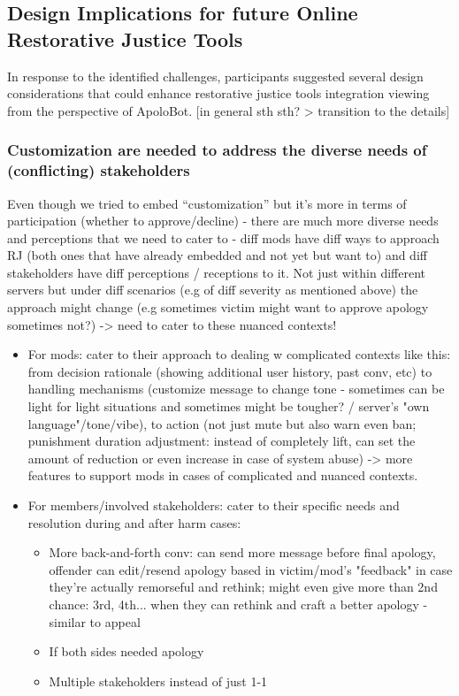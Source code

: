 \subsection{Design Implications for future Online Restorative Justice Tools}
In response to the identified challenges, participants suggested several design considerations that could enhance restorative justice tools integration viewing from the perspective of ApoloBot. [in general sth sth? > transition to the details] 

\subsubsection{Customization are needed to address the diverse needs of (conflicting) stakeholders} Even though we tried to embed “customization” but it’s more in terms of participation (whether to approve/decline) - there are much more diverse needs and perceptions that we need to cater to - diff mods have diff ways to approach RJ (both ones that have already embedded and not yet but want to) and diff stakeholders have diff perceptions / receptions to it. Not just within different servers but under diff scenarios (e.g of diff severity as mentioned above) the approach might change (e.g sometimes victim might want to approve apology sometimes not?) -> need to cater to these nuanced contexts!
\begin{itemize}
    \item For mods: cater to their approach to dealing w complicated contexts like this: from decision rationale (showing additional user history, past conv, etc) to handling mechanisms (customize message to change tone - sometimes can be light for light situations and sometimes might be tougher? / server's "own language"/tone/vibe), to action (not just mute but also warn even ban; punishment duration adjustment: instead of completely lift, can set the amount of reduction or even increase in case of system abuse) -> more features to support mods in cases of complicated and nuanced contexts.
    \item For members/involved stakeholders: cater to their specific needs and resolution during and after harm cases:
    \begin{itemize}
        \item More back-and-forth conv: can send more message before final apology, offender can edit/resend apology based in victim/mod's "feedback" in case they're actually remorseful and rethink; might even give more than 2nd chance: 3rd, 4th... when they can rethink and craft a better apology - similar to appeal
        \item If both sides needed apology
        \item Multiple stakeholders instead of just 1-1
    \end{itemize}

\end{itemize}

